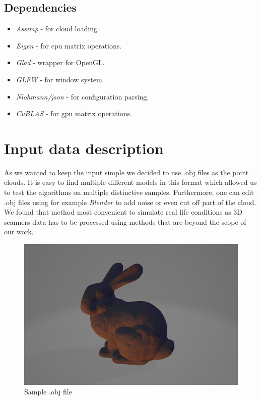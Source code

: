 \documentclass[titlepage]{article}
\begin{document}
\subsection{Dependencies}
\begin{itemize}
\item \textit{Assimp} - for cloud loading.
\item \textit{Eigen} - for cpu matrix operations.
\item \textit{Glad} - wrapper for OpenGL.
\item \textit{GLFW} - for window system.
\item \textit{Nlohmann/json} - for configuration parsing.
\item \textit{CuBLAS} - for gpu matrix operations.
\end{itemize}

\section{Input data description}

As we wanted to keep the input simple we decided to use .obj files as the point clouds. It is easy to find multiple different models in this format which allowed us to test the algorithms on multiple distinctive samples. Furthermore, one can edit .obj files using for example \textit{Blender} to add noise or even cut off part of the cloud. We found that method most convenient to simulate real life conditions as 3D scanners data has to be processed using methods that are beyond the scope of our work.

\begin{figure}[H]
\includegraphics[width=\textwidth]{ms-bunny.png}
\caption{Sample .obj file}
\end{figure}
\end{document}
